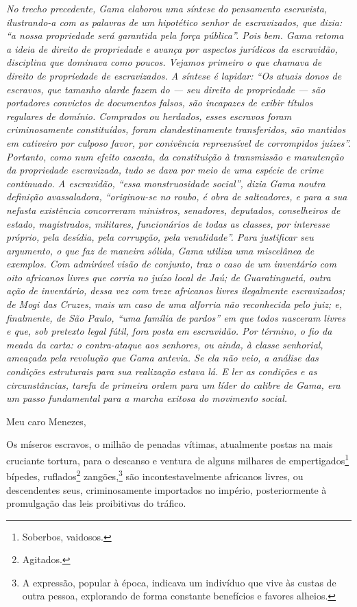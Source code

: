 \begin{resumo}
\emph{No trecho precedente, Gama elaborou uma síntese do pensamento
escravista, ilustrando-a com as palavras de um hipotético senhor de
escravizados, que dizia: ``a nossa propriedade será garantida pela força
pública''. Pois bem. Gama retoma a ideia de direito de propriedade e
avança por aspectos jurídicos da escravidão, disciplina que dominava
como poucos. Vejamos primeiro o que chamava de direito de propriedade de
escravizados. A síntese é lapidar: ``Os atuais donos de escravos, que
tamanho alarde fazem do --- seu direito de propriedade --- são portadores
convictos de documentos falsos, são incapazes de exibir títulos
regulares de domínio. Comprados ou herdados, esses escravos foram
criminosamente constituídos, foram clandestinamente transferidos, são
mantidos em cativeiro por culposo favor, por conivência repreensível de
corrompidos juízes''. Portanto, como num efeito cascata, da constituição
à transmissão e manutenção da propriedade escravizada, tudo se dava por
meio de uma espécie de crime continuado. A escravidão, ``essa
monstruosidade social'', dizia Gama noutra definição avassaladora,
``originou-se no roubo, é obra de salteadores, e para a sua nefasta
existência concorreram ministros, senadores, deputados, conselheiros de
estado, magistrados, militares, funcionários de todas as classes, por
interesse próprio, pela desídia, pela corrupção, pela venalidade''. Para
justificar seu argumento, o que faz de maneira sólida, Gama utiliza uma
miscelânea de exemplos. Com admirável visão de conjunto, traz o caso de
um inventário com oito africanos livres que corria no juízo local de
Jaú; de Guaratinguetá, outra ação de inventário, dessa vez com treze
africanos livres ilegalmente escravizados; de Mogi das Cruzes, mais um
caso de uma alforria não reconhecida pelo juiz; e, finalmente, de São
Paulo, ``uma família de pardos'' em que todos nasceram livres e que, sob
pretexto legal fútil, fora posta em escravidão. Por término, o fio da
meada da carta: o contra-ataque aos senhores, ou ainda, à classe
senhorial, ameaçada pela revolução que Gama antevia. Se ela
não veio, a análise das condições estruturais para sua realização estava lá. E ler as condições e as circunstâncias, tarefa de
primeira ordem para um líder do calibre de Gama, era um passo
fundamental para a marcha exitosa do movimento social.}
\end{resumo}

Meu caro Menezes,

Os míseros escravos, o milhão de penadas vítimas, atualmente postas na
mais cruciante tortura, para o descanso e ventura de alguns milhares de
empertigados\footnote{Soberbos, vaidosos.} bípedes, ruflados\footnote{
  Agitados.} zangões,\footnote{A expressão, popular à época, indicava
  um indivíduo que vive às custas de outra pessoa, explorando de forma
  constante benefícios e favores alheios.} são incontestavelmente
africanos livres, ou descendentes seus, criminosamente importados no
império, posteriormente à promulgação das leis proibitivas do tráfico.

